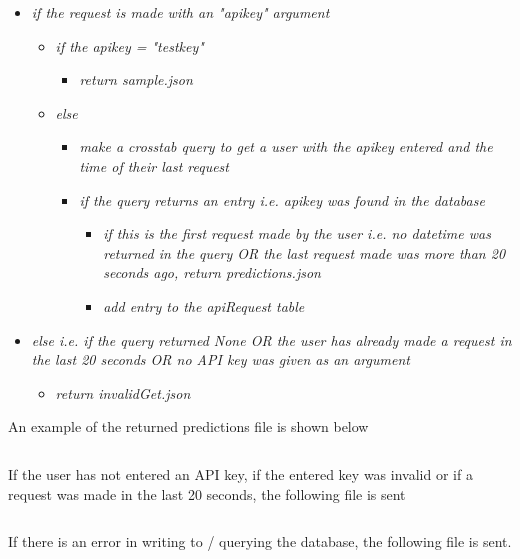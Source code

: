         \begin{itemize}
            \item \textit{if the request is made with an "apikey" argument}
            \begin{itemize}
                \item \textit{if the apikey = "testkey"}
                \begin{itemize}
                    \item \textit{return sample.json}
                \end{itemize}
                \item \textit{else}
                \begin{itemize}
                    \item \textit{make a crosstab query to get a user with the apikey entered and the time of their last request}
                    \item \textit{if the query returns an entry i.e. apikey was found in the database}
                    \begin{itemize}
                        \item \textit{if this is the first request made by the user i.e. no datetime was returned in the query OR the last request made was more than 20 seconds ago, return predictions.json}
                        \item \textit{add entry to the apiRequest table}
                    \end{itemize}
                \end{itemize}
            \end{itemize}
            \item \textit{else i.e. if the query returned None OR the user has already made a request in the last 20 seconds OR no API key was given as an argument}
            
            \begin{itemize}
            \item \textit{return invalidGet.json}
            \end{itemize}            
        \end{itemize}

        An example of the returned predictions file is shown below

        \inputminted[frame=single, framesep=3mm, linenos=true, xleftmargin=2pt, tabsize=4, breaklines]{js}{../source/site/static/json/sample.json}

        If the user has not entered an API key, if the entered key was invalid or if a request was made in the last 20 seconds, the following file is sent 
        
        \inputminted[frame=single, framesep=3mm, linenos=true, xleftmargin=2pt, tabsize=4, breaklines]{js}{../source/site/static/json/invalidGet.json}

        If there is an error in writing to / querying the database, the following file is sent.
        \inputminted[frame=single, framesep=3mm, linenos=true, xleftmargin=2pt, tabsize=4, breaklines]{js}{../source/site/static/json/error.json}
